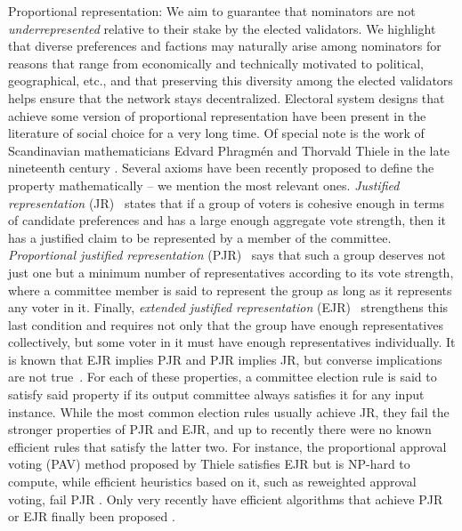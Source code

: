 Proportional representation: We aim to guarantee that nominators are not \emph{underrepresented} relative to their stake by the elected validators. We highlight that diverse preferences and factions may naturally arise among nominators for reasons that range from economically and technically motivated to political, geographical, etc., and that preserving this diversity among the elected validators helps ensure that the network stays decentralized. 
Electoral system designs that achieve some version of proportional representation have been present in the literature of social choice for a very long time. Of special note is the work of Scandinavian mathematicians Edvard Phragm\'{e}n and Thorvald Thiele in the late nineteenth century \cite{phragmen1894methode, phragmen1895proportionella, phragmen1896theorie, phragmen1899till, thiele1895om, janson2016phragmen}. 
Several axioms have been recently proposed to define the property mathematically -- we mention the most relevant ones. 
\emph{Justified representation} (JR)~\cite{aziz2017justified} states that if a group of voters is cohesive enough in terms of candidate preferences and has a large enough aggregate vote strength, then it has a justified claim to be represented by a member of the committee.
\emph{Proportional justified representation} (PJR)~\cite{sanchez2017proportional} says that such a group deserves not just one but a minimum number of representatives according to its vote strength, where a committee member is said to represent the group as long as it represents any voter in it.
Finally, \emph{extended justified representation} (EJR)~\cite{aziz2017justified} strengthens this last condition and requires not only that the group have enough representatives collectively, but some voter in it must have enough representatives individually.
It is known that EJR implies PJR and PJR implies JR, but converse implications are not true~\cite{sanchez2017proportional}. %
For each of these properties, a committee election rule is said to satisfy said property if its output committee always satisfies it for any input instance. 
While the most common election rules usually achieve JR, they fail the stronger properties of PJR and EJR, and up to recently there were no known efficient rules that satisfy the latter two. 
For instance, the proportional approval voting (PAV) method \cite{thiele1895om, janson2016phragmen} proposed by Thiele satisfies EJR but is NP-hard to compute, while efficient heuristics based on it, such as reweighted approval voting, fail PJR \cite{aziz2014computational, skowron2016finding, aziz2017justified}. 
Only very recently have efficient algorithms that achieve PJR or EJR finally been proposed \cite{brill2017phragmen, sanchez2016maximin, aziz2018complexity, peters2019proportionality}. 

